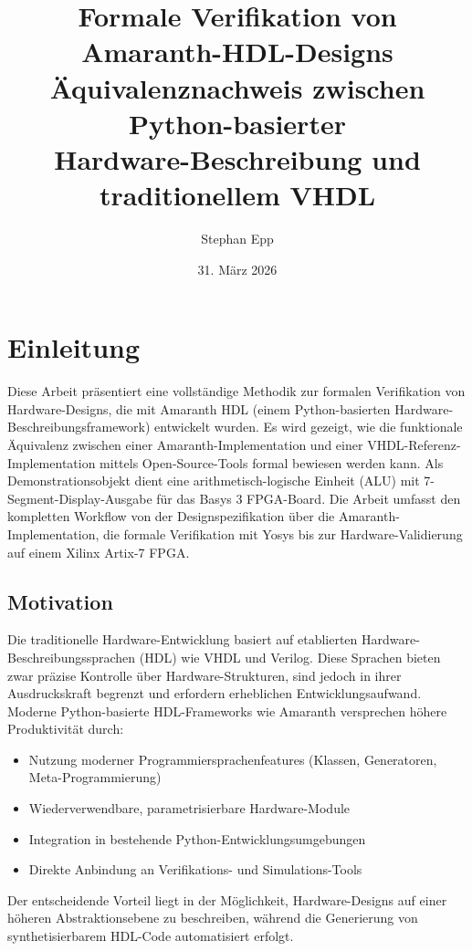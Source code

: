 ﻿\documentclass[12pt,a4paper]{report}
\title{\textbf{Formale Verifikation von Amaranth-HDL-Designs} \\
    \large Äquivalenznachweis zwischen Python-basierter \\ Hardware-Beschreibung und traditionellem VHDL}
\author{Stephan Epp}
\date{31. März 2026}
\begin{document}
\maketitle
\tableofcontents
\newpage

\chapter{Einleitung}

Diese Arbeit präsentiert eine vollständige Methodik zur formalen Verifikation von Hardware-Designs, die mit Amaranth HDL (einem Python-basierten Hardware-Beschreibungsframe\-work) entwickelt wurden. Es wird gezeigt, wie die funktionale Äquivalenz zwischen einer Amaranth-Implementation und einer VHDL-Referenz-Implementation mittels Open-Source-Tools formal bewiesen werden kann. Als Demonstrationsobjekt dient eine arithmetisch-logische Einheit (ALU) mit 7-Segment-Display-Ausgabe für das Basys 3 FPGA-Board. Die Arbeit umfasst den kompletten Workflow von der Designspezifikation über die Amaranth-Implementation, die formale Verifikation mit Yosys bis zur Hardware-Validierung auf einem Xilinx Artix-7 FPGA.

\section{Motivation}

Die traditionelle Hardware-Entwicklung basiert auf etablierten Hardware-Beschreibungs\-sprachen (HDL) wie VHDL und Verilog. Diese Sprachen bieten zwar präzise Kontrolle über Hardware-Strukturen, sind jedoch in ihrer Ausdruckskraft begrenzt und erfordern erheblichen Entwicklungsaufwand. Moderne Python-basierte HDL-Frameworks wie Amaranth \cite{amaranth2024} versprechen höhere Produktivität durch:

\begin{itemize}
    \item Nutzung moderner Programmiersprachenfeatures (Klassen, Generatoren, Meta-Programmierung)
    \item Wiederverwendbare, parametrisierbare Hardware-Module
    \item Integration in bestehende Python-Entwicklungsumgebungen
    \item Direkte Anbindung an Verifikations- und Simulations-Tools
\end{itemize}

Der entscheidende Vorteil liegt in der Möglichkeit, Hardware-Designs auf einer höheren Abstraktionsebene zu beschreiben, während die Generierung von synthetisierbarem HDL-Code automatisiert erfolgt.
\end{document}

